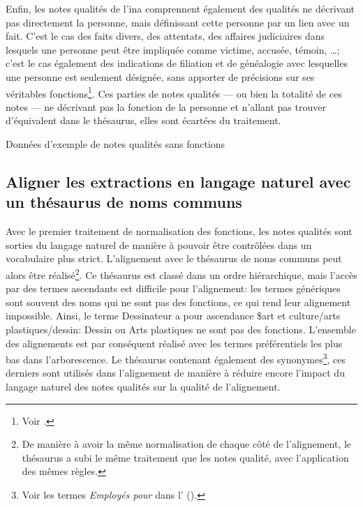 Enfin, les notes qualités de l'\ac{ina} comprennent également des qualités ne décrivant pas directement la personne, mais définissant cette personne par un lien avec un fait. C'est le cas des faits divers, des attentats, des affaires judiciaires dans lesquels une personne peut être impliquée comme victime, accusée, témoin, \dots; c'est le cas également des indications de filiation et de généalogie avec lesquelles une personne est seulement désignée, sans apporter de précisions sur ses véritables fonctions\footnote{Voir .}. Ces parties de notes qualités --- ou bien la totalité de ces notes --- ne décrivant pas la fonction de la personne et n'allant pas trouver d'équivalent dans le thésaurus, elles sont écartées du traitement.
\begin{table}[!h]
	\centering
	\caption{Données d'exemple de notes qualités sans fonctions}
	\label{exemple_NQ_sans_fonctions}
\end{table}

\subsection{\label{I-C-3-b}Aligner les extractions en langage naturel avec un thésaurus de noms communs}

Avec le premier traitement de normalisation des fonctions, les notes qualités sont sorties du langage naturel de manière à pouvoir être contrôlées dans un vocabulaire plus strict. L'alignement avec le thésaurus de noms communs peut alors être réalisé\footnote{De manière à avoir la même normalisation de chaque côté de l'alignement, le thésaurus a subi le même traitement que les notes qualité, avec l'application des mêmes règles.}. Ce thésaurus est classé dans un ordre hiérarchique, mais l'accès par des termes ascendants est difficile pour l'alignement: les termes génériques sont souvent des noms qui ne sont pas des fonctions, ce qui rend leur alignement impossible. Ainsi, le terme \og Dessinateur\fg{} a pour ascendance \og \$art et culture/arts plastiques/dessin\fg{}: \og Dessin\fg{} ou \og Arts plastiques\fg{} ne sont pas des fonctions. L'ensemble des alignements est par conséquent réalisé avec les termes préférentiels les plus bas dans l'arborescence. Le thésaurus contenant également des synonymes\footnote{Voir les termes \textit{Employés pour} dans l' ().}, ces derniers sont utilisés dans l'alignement de manière à réduire encore l'impact du langage naturel des notes qualités sur la qualité de l'alignement.\\

